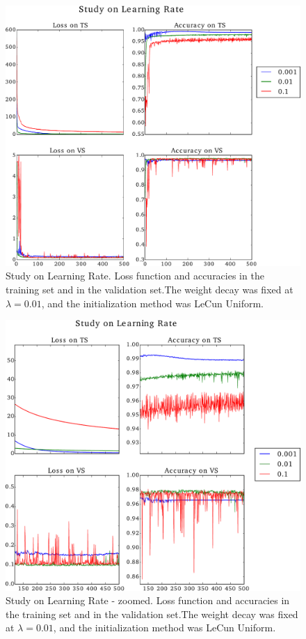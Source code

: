 \documentclass{article}
\begin{document}
\begin{figure}[H]
	\centering
	\includegraphics[width=\linewidth]{study-on-LR.pdf}
	\caption{Study on Learning Rate. Loss function and accuracies in the training set and in the validation set.The weight decay was fixed at $\lambda = 0.01$, and the initialization method was LeCun Uniform.
}
\label{fig:study-LR}
\end{figure}


\begin{figure}[H]
	\centering
	\includegraphics[width=\linewidth]{study-on-LR-zoomed-ending.pdf}
	\caption{Study on Learning Rate - zoomed. Loss function and accuracies in the training set and in the validation set.The weight decay was fixed at $\lambda = 0.01$, and the initialization method was LeCun Uniform.
}
\label{fig:study-LR-zoomed}
\end{figure}
\end{document}
